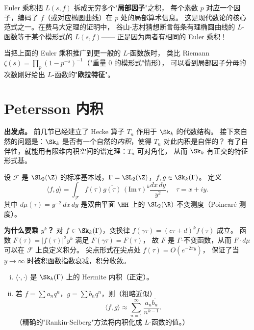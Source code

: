 \begin{remark}
Euler 乘积把 $L(s,f)$ 拆成无穷多个"\textbf{局部因子}"之积，
每个素数 $p$ 对应一个因子，编码了 $f$（或对应椭圆曲线）在 $p$ 处的局部算术信息。
这是现代数论的核心范式之一。在费马大定理的证明中，
谷山-志村猜想断言每条有理椭圆曲线的 $L$-函数等于某个模形式的 $L(s,f)$——
正是因为两者有相同的 Euler 乘积！
\end{remark}

\begin{example}
当把上面的 Euler 乘积推广到更一般的 $L$-函数族时，
类比 Riemann $\zeta(s) = \prod_p (1-p^{-s})^{-1}$（"重量 0 的模形式"情形），
可以看到局部因子分母的次数刚好给出 $L$-函数的"\textbf{欧拉特征}"。
\end{example}


\section{Petersson 内积}
\label{sec:petersson}

\textbf{出发点。}
前几节已经建立了 Hecke 算子 $T_n$ 作用于 $\Sk_k$ 的代数结构。
接下来自然的问题是：$\Sk_k$ 是否有一个自然的\emph{内积}，使得 $T_n$ 对此内积是自伴的？
有了自伴性，就能用有限维内积空间的谱定理：$T_n$ 可对角化，
从而 $\Sk_k$ 有正交的特征形式基。

\begin{definition}[Petersson 内积]
\label{def:petersson}
设 $\mathcal{F}$ 是 $\SL_2(\Z)$ 的标准基本域，$\Gamma = \SL_2(\Z)$，$f, g \in \Sk_k(\Gamma)$。
定义
\[
  \langle f, g \rangle
  = \int_{\mathcal{F}} f(\tau)\overline{g(\tau)}\, (\mathrm{Im}\,\tau)^k
    \frac{dx\,dy}{y^2},
  \quad \tau = x + iy.
\]
其中 $d\mu(\tau) = y^{-2}\,dx\,dy$ 是双曲平面 $\HH$ 上的 $\SL_2(\R)$-不变测度（Poincaré 测度）。
\end{definition}



\textbf{为什么要乘 $y^k$？}
对 $f \in \Sk_k(\Gamma)$，变换律 $f(\gamma\tau) = (c\tau+d)^k f(\tau)$ 成立。
函数 $F(\tau) = |f(\tau)|^2 y^k$ 满足 $F(\gamma\tau) = F(\tau)$，
故 $F$ 是 $\Gamma$-不变函数，从而 $F \cdot d\mu$ 可以在 $\mathcal{F}$ 上良定义积分。
尖点形式在尖点处 $f(\tau) = O(e^{-2\pi y})$，
保证了当 $y \to \infty$ 时被积函数指数衰减，积分收敛。

\begin{proposition}[内积的性质]
\label{prop:petersson-properties}
\begin{enumerate}[(i)]
  \item $\langle \cdot, \cdot \rangle$ 是 $\Sk_k(\Gamma)$ 上的 Hermite 内积（正定）。
  \item 若 $f = \sum a_n q^n$，$g = \sum b_n q^n$，则（粗略近似）
        \[
          \langle f, g \rangle
          \approx \sum_{n=1}^\infty \frac{a_n \overline{b_n}}{n^{k-1}}.
        \]
        （精确的"Rankin-Selberg"方法将内积化成 $L$-函数的值。）
\end{enumerate}
\end{proposition}

